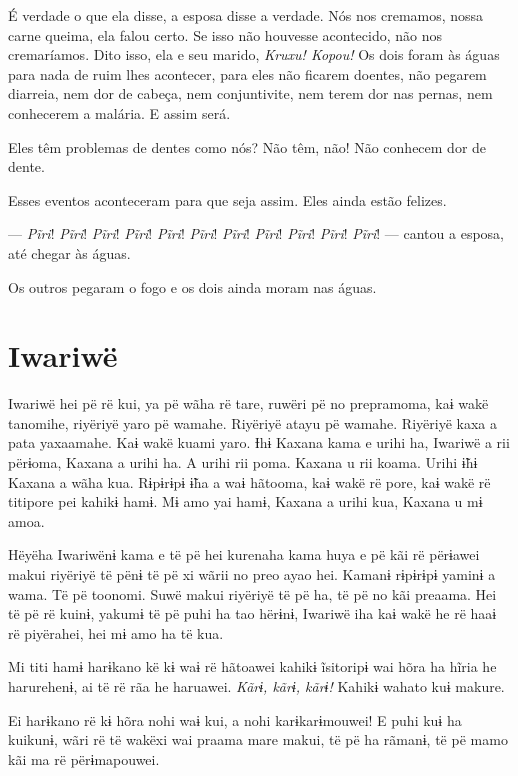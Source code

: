 É verdade o que ela disse, a esposa disse a verdade. Nós nos cremamos,
nossa carne queima, ela falou certo. Se isso não houvesse acontecido,
não nos cremaríamos. Dito isso, ela e seu marido, \textit{Kruxu! Kopou!} Os dois
foram às águas para nada de ruim lhes acontecer, para eles não ficarem
doentes, não pegarem diarreia, nem dor de cabeça, nem conjuntivite, nem
terem dor nas pernas, nem conhecerem a malária. E assim será. 

Eles têm problemas de dentes como nós? Não têm, não! Não conhecem dor de
dente. 

Esses eventos aconteceram para que seja assim. Eles ainda estão
felizes. 

--- \textit{Pĩri}! \textit{Pĩri}! \textit{Pĩri}! \textit{Pĩri}! \textit{Pĩri}! \textit{Pĩri}! \textit{Pĩri}! \textit{Pĩri}! \textit{Pĩri}! \textit{Pĩri}! \textit{Pĩri}!
--- cantou a esposa, até chegar às águas. 

Os outros pegaram o fogo e os dois ainda moram nas águas.

\chapter{Iwariwë}

 Iwariwë hei pë rë kui, ya pë wãha rë tare, ruwëri pë no prepramoma,
kaɨ wakë tanomihe, riyëriyë yaro pë wamahe. Riyëriyë atayu pë wamahe.
Riyëriyë kaxa a pata yaxaamahe. Kaɨ wakë kuami yaro. Ɨhɨ Kaxana kama e
urihi ha, Iwariwë a rii përɨoma, Kaxana a urihi ha. A urihi rii poma.
Kaxana u rii koama. Urihi ɨ̃hɨ Kaxana a wãha kua. Rɨpɨrɨpɨ ɨ̃ha a waɨ
hãtooma, kaɨ wakë rë pore, kaɨ wakë rë titipore pei kahikɨ hamɨ. Mɨ amo
yai hamɨ, Kaxana a urihi kua, Kaxana u mɨ amoa. 

Hëyëha Iwariwënɨ kama e të pë hei kurenaha kama huya e pë kãi rë
përɨawei makui riyëriyë të pënɨ të pë xi wãrii no preo ayao hei. Kamanɨ
rɨpɨrɨpɨ yaminɨ a wama. Të pë toonomi. Suwë makui riyëriyë të pë ha, të
pë no kãi preaama. Hei të pë rë kuinɨ, yakumɨ të pë puhi ha tao hërɨnɨ,
Iwariwë iha kaɨ wakë he rë haaɨ rë piyërahei, hei mɨ amo ha të kua. 

Mi titi hamɨ harɨkano kë kɨ waɨ rë hãtoawei kahikɨ ĩsitoripɨ wai hõra ha
hĩria he harurehenɨ, ai të rë rãa he haruawei. \textit{Kãrɨ, kãrɨ, kãrɨ!} Kahikɨ
wahato kuɨ makure. 

Ei harɨkano rë kɨ hõra nohi waɨ kui, a nohi karɨkarɨmouwei! E puhi kuɨ
ha kuikunɨ, wãri rë të wakëxi wai praama mare makui, të pë ha rãmanɨ, të
pë mamo kãi ma rë përɨmapouwei. 

